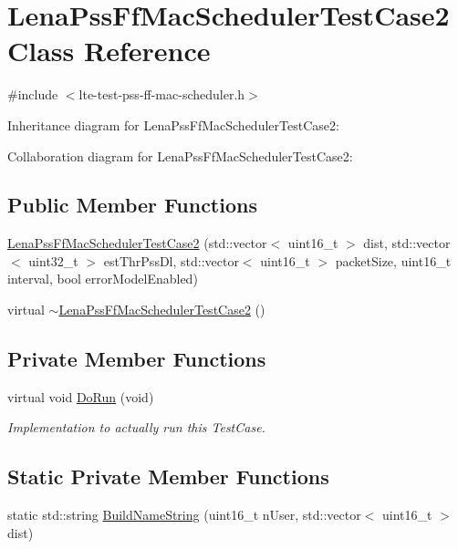 \hypertarget{classLenaPssFfMacSchedulerTestCase2}{}\section{Lena\+Pss\+Ff\+Mac\+Scheduler\+Test\+Case2 Class Reference}
\label{classLenaPssFfMacSchedulerTestCase2}


{\ttfamily \#include $<$lte-\/test-\/pss-\/ff-\/mac-\/scheduler.\+h$>$}



Inheritance diagram for Lena\+Pss\+Ff\+Mac\+Scheduler\+Test\+Case2\+:


Collaboration diagram for Lena\+Pss\+Ff\+Mac\+Scheduler\+Test\+Case2\+:
\subsection*{Public Member Functions}
\begin{DoxyCompactItemize}
\item 
\hyperlink{classLenaPssFfMacSchedulerTestCase2_aded27e7b0def81f7d98f4fb20af6b4d1}{Lena\+Pss\+Ff\+Mac\+Scheduler\+Test\+Case2} (std\+::vector$<$ uint16\+\_\+t $>$ dist, std\+::vector$<$ uint32\+\_\+t $>$ est\+Thr\+Pss\+Dl, std\+::vector$<$ uint16\+\_\+t $>$ packet\+Size, uint16\+\_\+t interval, bool error\+Model\+Enabled)
\item 
virtual \hyperlink{classLenaPssFfMacSchedulerTestCase2_afd6dd67de7d362b400a3d43d9bf1b872}{$\sim$\+Lena\+Pss\+Ff\+Mac\+Scheduler\+Test\+Case2} ()
\end{DoxyCompactItemize}
\subsection*{Private Member Functions}
\begin{DoxyCompactItemize}
\item 
virtual void \hyperlink{classLenaPssFfMacSchedulerTestCase2_aff2e955c075aacd1f05d38b81ace0c3a}{Do\+Run} (void)
\begin{DoxyCompactList}\small\item\em Implementation to actually run this Test\+Case. \end{DoxyCompactList}\end{DoxyCompactItemize}
\subsection*{Static Private Member Functions}
\begin{DoxyCompactItemize}
\item 
static std\+::string \hyperlink{classLenaPssFfMacSchedulerTestCase2_a3b3487d8fde82c25bbc185869a290691}{Build\+Name\+String} (uint16\+\_\+t n\+User, std\+::vector$<$ uint16\+\_\+t $>$ dist)
\end{DoxyCompactItemize}
